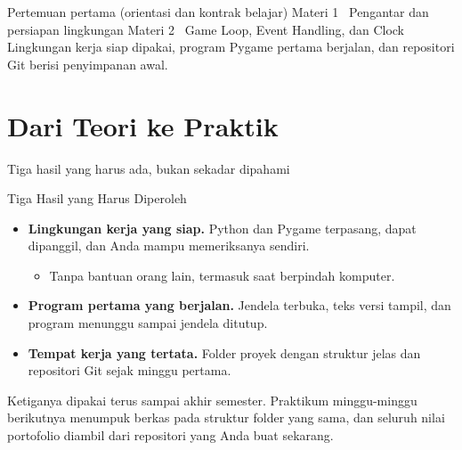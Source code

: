 \documentclass[aspectratio=169,10pt]{beamer}
\begin{document}
  {Pertemuan pertama (orientasi dan kontrak belajar)}
  {Materi 1 \textperiodcentered\ Pengantar dan persiapan lingkungan}
  {Materi 2 \textperiodcentered\ Game Loop, Event Handling, dan Clock}
  {Lingkungan kerja siap dipakai, program Pygame pertama berjalan, dan
   repositori Git berisi penyimpanan awal.}

\section{Dari Teori ke Praktik}
  {Tiga hasil yang harus ada, bukan sekadar dipahami}

\begin{frame}{Tiga Hasil yang Harus Diperoleh}
\begin{itemize}
  \item \textbf{Lingkungan kerja yang siap.} Python dan Pygame terpasang,
        dapat dipanggil, dan Anda mampu memeriksanya sendiri.
        \begin{itemize}
          \item Tanpa bantuan orang lain, termasuk saat berpindah komputer.
        \end{itemize}
  \item \textbf{Program pertama yang berjalan.} Jendela terbuka, teks versi
        tampil, dan program menunggu sampai jendela ditutup.
  \item \textbf{Tempat kerja yang tertata.} Folder proyek dengan struktur
        jelas dan repositori Git sejak minggu pertama.
\end{itemize}
\vspace{0.2cm}
\begin{kotak}
Ketiganya dipakai terus sampai akhir semester. Praktikum minggu-minggu
berikutnya menumpuk berkas pada struktur folder yang sama, dan seluruh nilai
portofolio diambil dari repositori yang Anda buat sekarang.
\end{kotak}
\end{frame}
\end{document}
